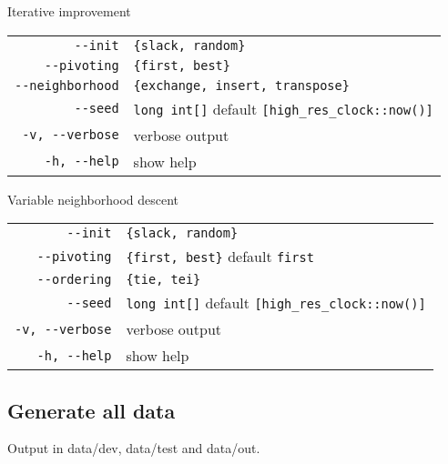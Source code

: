 \documentclass[a4paper,12pt]{article}
\begin{document}
Iterative improvement


\begin{tabular}{rl}
\verb!--init! & \verb!{slack, random}!\\
\verb!--pivoting! & \verb!{first, best}!\\
\verb!--neighborhood! & \verb!{exchange, insert, transpose}!\\
\verb!--seed! & \verb!long int[]! default \verb![high_res_clock::now()]!\\
\verb!-v, --verbose! & verbose output\\
\verb!-h, --help! & show help\\
\end{tabular}

Variable neighborhood descent



\begin{tabular}{rl}
\verb!--init! & \verb!{slack, random}!\\
\verb!--pivoting! & \verb!{first, best}! default \verb!first!\\
\verb!--ordering! & \verb!{tie, tei}!\\
\verb!--seed! & \verb!long int[]! default \verb![high_res_clock::now()]!\\
\verb!-v, --verbose! & verbose output\\
\verb!-h, --help! & show help\\
\end{tabular}




\subsection{Generate all data}

Output in data/dev, data/test and data/out.

\appendix
\newpage\cleardoublepage{}
\end{document}
